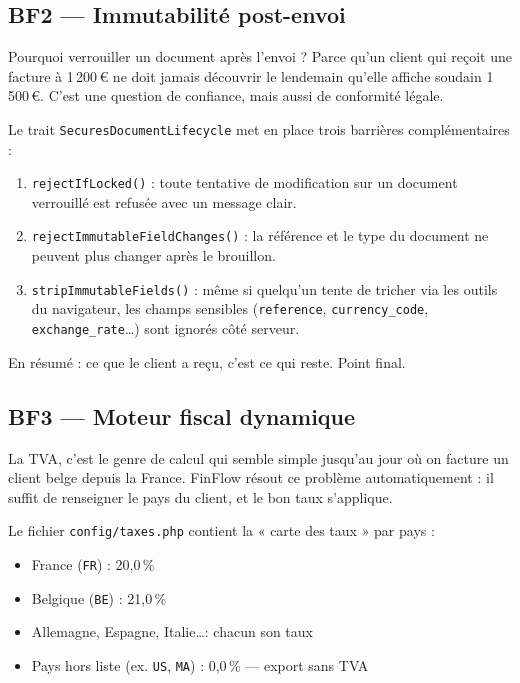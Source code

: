 \documentclass[12pt,a4paper]{report}
\begin{document}
\subsection{BF2 — Immutabilité post-envoi}

Pourquoi verrouiller un document après l'envoi ? Parce qu'un client qui reçoit une facture à 1\,200\,€ ne doit jamais découvrir le lendemain qu'elle affiche soudain 1\,500\,€. C'est une question de confiance, mais aussi de conformité légale.

Le trait \texttt{SecuresDocumentLifecycle} met en place trois barrières complémentaires :
\begin{enumerate}[leftmargin=*]
    \item \texttt{rejectIfLocked()} : toute tentative de modification sur un document verrouillé est refusée avec un message clair.
    \item \texttt{rejectImmutableFieldChanges()} : la référence et le type du document ne peuvent plus changer après le brouillon.
    \item \texttt{stripImmutableFields()} : même si quelqu'un tente de tricher via les outils du navigateur, les champs sensibles (\texttt{reference}, \texttt{currency\_code}, \texttt{exchange\_rate}\ldots) sont ignorés côté serveur.
\end{enumerate}

En résumé : ce que le client a reçu, c'est ce qui reste. Point final.

\subsection{BF3 — Moteur fiscal dynamique}

La TVA, c'est le genre de calcul qui semble simple jusqu'au jour où on facture un client belge depuis la France. FinFlow résout ce problème automatiquement : il suffit de renseigner le pays du client, et le bon taux s'applique.

Le fichier \texttt{config/taxes.php} contient la « carte des taux » par pays :
\begin{itemize}[leftmargin=*]
    \item France (\texttt{FR}) : 20{,}0\,\%
    \item Belgique (\texttt{BE}) : 21{,}0\,\%
    \item Allemagne, Espagne, Italie\ldots : chacun son taux
    \item Pays hors liste (ex. \texttt{US}, \texttt{MA}) : 0{,}0\,\% --- export sans TVA
\end{itemize}
\end{document}
